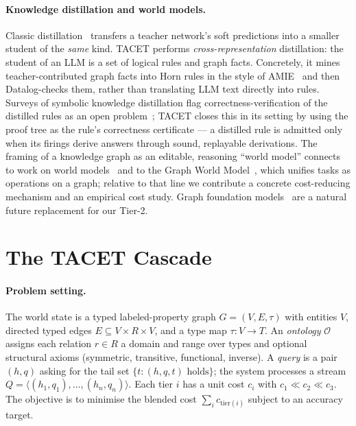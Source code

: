 \documentclass[11pt]{article}
\theoremstyle{plain}
\begin{document}
\paragraph{Knowledge distillation and world models.} Classic
distillation~\citep{hinton2015distillation} transfers a teacher network's
soft predictions into a smaller student of the \emph{same} kind. TACET
performs \emph{cross-representation} distillation: the student of an LLM is
a set of logical rules and graph facts. Concretely, it mines
teacher-contributed graph facts into Horn rules in the style of
AMIE~\citep{galarraga2015amie} and then Datalog-checks them, rather than
translating LLM text directly into rules. Surveys of symbolic knowledge
distillation flag correctness-verification of the distilled rules as an open
problem~\citep{symdistill2024}; TACET closes this in its setting by using
the proof tree as the rule's correctness certificate --- a distilled rule is
admitted only when its firings derive answers through sound, replayable
derivations. The framing of a knowledge graph as
an editable, reasoning ``world model'' connects to work on world
models~\citep{ha2018worldmodels,lecun2022jepa} and to the Graph World
Model~\citep{feng2025gwm}, which unifies tasks as operations on a graph;
relative to that line we contribute a concrete cost-reducing mechanism and
an empirical cost study. Graph foundation models~\citep{liu2025gfm,
battaglia2018relational} are a natural future replacement for our Tier-2.

\section{The TACET Cascade}
\label{sec:cascade}

\paragraph{Problem setting.} The world state is a typed labeled-property
graph $G=(V,E,\tau)$ with entities $V$, directed typed edges
$E\subseteq V\times R\times V$, and a type map $\tau:V\to T$. An
\emph{ontology} $\mathcal{O}$ assigns each relation $r\in R$ a domain and
range over types and optional structural axioms (symmetric, transitive,
functional, inverse). A \emph{query} is a pair $(h,q)$ asking for the tail
set $\{t : (h,q,t)\text{ holds}\}$; the system processes a stream
$Q=\langle (h_1,q_1),\dots,(h_n,q_n)\rangle$. Each tier $i$ has a unit cost
$c_i$ with $c_1\!\ll\!c_2\!\ll\!c_3$. The objective is to minimise the
blended cost $\sum_i c_{\mathrm{tier}(i)}$ subject to an accuracy target.
\end{document}
